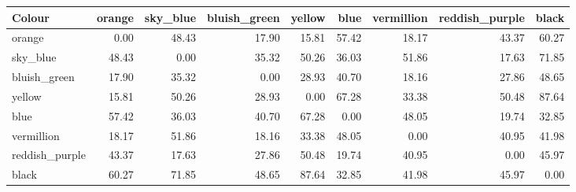 \begin{tabular}{lrrrrrrrr}
\toprule
Colour & orange & sky\_blue & bluish\_green & yellow & blue & vermillion & reddish\_purple & black \\
\midrule
orange & 0.00 & 48.43 & 17.90 & 15.81 & 57.42 & 18.17 & 43.37 & 60.27 \\
sky\_blue & 48.43 & 0.00 & 35.32 & 50.26 & 36.03 & 51.86 & 17.63 & 71.85 \\
bluish\_green & 17.90 & 35.32 & 0.00 & 28.93 & 40.70 & 18.16 & 27.86 & 48.65 \\
yellow & 15.81 & 50.26 & 28.93 & 0.00 & 67.28 & 33.38 & 50.48 & 87.64 \\
blue & 57.42 & 36.03 & 40.70 & 67.28 & 0.00 & 48.05 & 19.74 & 32.85 \\
vermillion & 18.17 & 51.86 & 18.16 & 33.38 & 48.05 & 0.00 & 40.95 & 41.98 \\
reddish\_purple & 43.37 & 17.63 & 27.86 & 50.48 & 19.74 & 40.95 & 0.00 & 45.97 \\
black & 60.27 & 71.85 & 48.65 & 87.64 & 32.85 & 41.98 & 45.97 & 0.00 \\
\bottomrule
\end{tabular}
